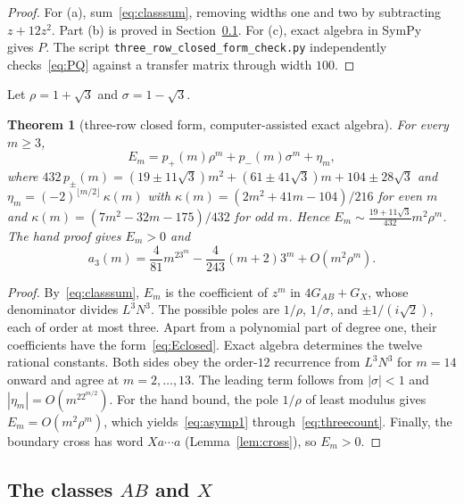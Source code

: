 \documentclass[12pt]{article}
\theoremstyle{plain}
\newtheorem{theorem}{Theorem}
\theoremstyle{definition}
\theoremstyle{remark}
\begin{document}
\begin{proof}
For (a), sum~\eqref{eq:classsum}, removing widths one and two by
subtracting $z+12z^2$. Part (b) is proved in Section~\ref{app:threegf}.
For (c), exact algebra in SymPy~\cite{sympy2017} gives $P$.
The script \nolinkurl{three_row_closed_form_check.py} independently
checks~\eqref{eq:PQ} against a transfer matrix through width $100$.
\end{proof}

Let $\rho=1+\sqrt3$ and $\sigma=1-\sqrt3$.

\begin{theorem}[three-row closed form, computer-assisted exact algebra]\label{thm:threeclosed}
For every $m\ge3$,
\begin{equation}\label{eq:Eclosed}
E_m=p_+(m)\rho^m+p_-(m)\sigma^m+\eta_m,
\end{equation}
where $432\,p_\pm(m)=(19\pm11\sqrt3)m^2+(61\pm41\sqrt3)m+104\pm28\sqrt3$ and $\eta_m=(-2)^{\lfloor m/2\rfloor}\,\kappa(m)$ with $\kappa(m)=(2m^2+41m-104)/216$ for even $m$ and
$\kappa(m)=(7m^2-32m-175)/432$ for odd $m$. Hence $E_m\sim\frac{19+11\sqrt3}{432}m^2\rho^m$. The hand proof gives $E_m>0$ and
\begin{equation}\label{eq:asymp1}
a_3(m)=\frac4{81}m^23^m-\frac4{243}(m+2)3^m+O(m^2\rho^m).
\end{equation}
\end{theorem}

\begin{proof}
By~\eqref{eq:classsum}, $E_m$ is the coefficient of $z^m$
in $4G_{AB}+G_X$, whose denominator divides $L^3N^3$.
The possible poles are $1/\rho$, $1/\sigma$, and $\pm1/(i\sqrt2)$,
each of order at most three. Apart from a polynomial part of degree one,
their coefficients have the form~\eqref{eq:Eclosed}.
Exact algebra determines the twelve rational constants. Both sides obey the order-$12$ recurrence
from $L^3N^3$ for $m=14$ onward and agree at $m=2,\dots,13$.
The leading term follows from $|\sigma|<1$ and
$|\eta_m|=O(m^22^{m/2})$. For the hand bound, the pole $1/\rho$
of least modulus gives $E_m=O(m^2\rho^m)$, which yields~\eqref{eq:asymp1}
through~\eqref{eq:threecount}. Finally, the boundary cross has word
$Xa\cdots a$ (Lemma~\ref{lem:cross}), so $E_m>0$.
\end{proof}
\subsection{\texorpdfstring{The classes $AB$ and $X$}{The classes AB and X}}\label{app:threegf}
\end{document}
